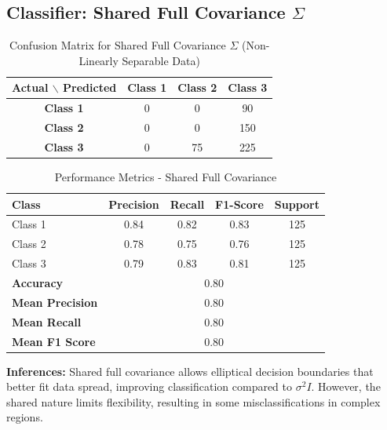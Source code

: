\subsection{Classifier: Shared Full Covariance $\Sigma$}


\begin{table}[H]
\centering
\caption{Confusion Matrix for Shared Full Covariance $\Sigma$ (Non-Linearly Separable Data)}
\label{tab:confmat_d3_sigma2I}
\begin{tabular}{|c|c|c|c|}
\hline
\textbf{Actual $\backslash$ Predicted} & \textbf{Class 1} & \textbf{Class 2} & \textbf{Class 3} \\
\hline
\textbf{Class 1} & 0 & 0   & 90   \\
\textbf{Class 2} & 0  & 0 & 150   \\
\textbf{Class 3} & 0   & 75   & 225 \\
\hline
\end{tabular}
\end{table}


\begin{table}[H]
\centering
\caption{Performance Metrics - Shared Full Covariance}
\begin{tabular}{lcccc}
\toprule
\textbf{Class} & \textbf{Precision} & \textbf{Recall} & \textbf{F1-Score} & \textbf{Support} \\
\midrule
Class 1 & 0.84 & 0.82 & 0.83 & 125 \\
Class 2 & 0.78 & 0.75 & 0.76 & 125 \\
Class 3 & 0.79 & 0.83 & 0.81 & 125 \\
\midrule
\textbf{Accuracy} & \multicolumn{4}{c}{0.80} \\
\textbf{Mean Precision} & \multicolumn{4}{c}{0.80} \\
\textbf{Mean Recall} & \multicolumn{4}{c}{0.80} \\
\textbf{Mean F1 Score} & \multicolumn{4}{c}{0.80} \\
\bottomrule
\end{tabular}
\end{table}

\textbf{Inferences:}  
Shared full covariance allows elliptical decision boundaries that better fit data spread, improving classification compared to $\sigma^2 I$. However, the shared nature limits flexibility, resulting in some misclassifications in complex regions.

